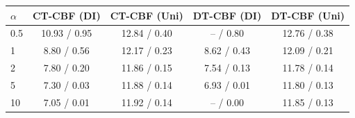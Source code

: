 \begin{tabular}{lcccc}
\hline
$\alpha$ & CT-CBF (DI) & CT-CBF (Uni) & DT-CBF (DI) & DT-CBF (Uni) \\
\hline
0.5 & 10.93 / 0.95 & 12.84 / 0.40 & -- / 0.80 & 12.76 / 0.38 \\
1 & 8.80 / 0.56 & 12.17 / 0.23 & 8.62 / 0.43 & 12.09 / 0.21 \\
2 & 7.80 / 0.20 & 11.86 / 0.15 & 7.54 / 0.13 & 11.78 / 0.14 \\
5 & 7.30 / 0.03 & 11.88 / 0.14 & 6.93 / 0.01 & 11.80 / 0.13 \\
10 & 7.05 / 0.01 & 11.92 / 0.14 & -- / 0.00 & 11.85 / 0.13 \\
\hline
\end{tabular}
